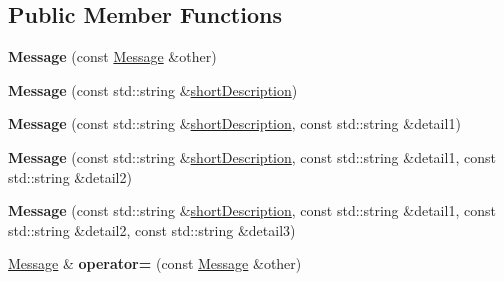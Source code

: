 \subsection*{Public Member Functions}
\begin{DoxyCompactItemize}
\item 
\hypertarget{class_message_ad253b20930e70257e2523bb9fc7d299c}{{\bfseries Message} (const \hyperlink{class_message}{Message} \&other)}\label{class_message_ad253b20930e70257e2523bb9fc7d299c}

\item 
\hypertarget{class_message_aad17a05b7c2d5f1ef207f7150691a03a}{{\bfseries Message} (const std\-::string \&\hyperlink{class_message_aa22497c35079e8619c516f693d1fd97f}{short\-Description})}\label{class_message_aad17a05b7c2d5f1ef207f7150691a03a}

\item 
\hypertarget{class_message_ab77d28861db855dadef024529aab07d8}{{\bfseries Message} (const std\-::string \&\hyperlink{class_message_aa22497c35079e8619c516f693d1fd97f}{short\-Description}, const std\-::string \&detail1)}\label{class_message_ab77d28861db855dadef024529aab07d8}

\item 
\hypertarget{class_message_ae8c66f7de0811d86765369a4c430bb6c}{{\bfseries Message} (const std\-::string \&\hyperlink{class_message_aa22497c35079e8619c516f693d1fd97f}{short\-Description}, const std\-::string \&detail1, const std\-::string \&detail2)}\label{class_message_ae8c66f7de0811d86765369a4c430bb6c}

\item 
\hypertarget{class_message_a65fcd0b70c65cf7b9b9de390386cef79}{{\bfseries Message} (const std\-::string \&\hyperlink{class_message_aa22497c35079e8619c516f693d1fd97f}{short\-Description}, const std\-::string \&detail1, const std\-::string \&detail2, const std\-::string \&detail3)}\label{class_message_a65fcd0b70c65cf7b9b9de390386cef79}

\item 
\hypertarget{class_message_a8003315e3355d1b0a5e3b7dcd5a0514c}{\hyperlink{class_message}{Message} \& {\bfseries operator=} (const \hyperlink{class_message}{Message} \&other)}\label{class_message_a8003315e3355d1b0a5e3b7dcd5a0514c}


\end{DoxyCompactItemize}
